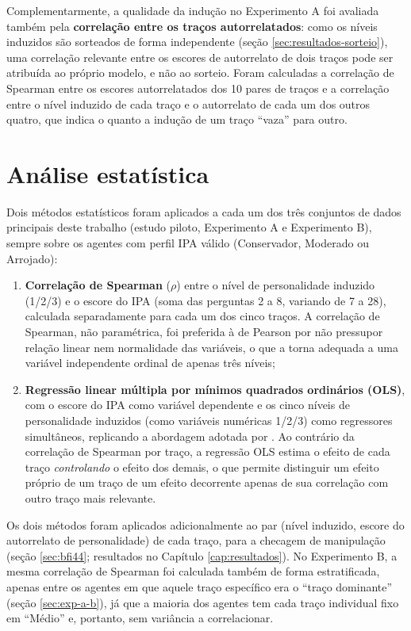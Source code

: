 Complementarmente, a qualidade da indução no Experimento A foi avaliada
também pela \textbf{correlação entre os traços autorrelatados}: como os
níveis induzidos são sorteados de forma independente (seção
\ref{sec:resultados-sorteio}), uma correlação relevante entre os escores
de autorrelato de dois traços pode ser atribuída ao próprio modelo, e não
ao sorteio. Foram
calculadas a correlação de Spearman entre os escores autorrelatados dos
10 pares de traços e a correlação entre o nível induzido de cada traço e
o autorrelato de cada um dos outros quatro, que indica o quanto a
indução de um traço ``vaza'' para outro.

\section{Análise estatística}
\label{sec:analise-estatistica}

Dois métodos estatísticos foram aplicados a cada um dos três conjuntos de
dados principais deste trabalho (estudo piloto, Experimento A e
Experimento B), sempre sobre os agentes com perfil IPA válido
(Conservador, Moderado ou Arrojado):

\begin{enumerate}
    \item \textbf{Correlação de Spearman} ($\rho$) entre o nível de
    personalidade induzido (1/2/3) e o escore do IPA (soma das perguntas
    2 a 8, variando de 7 a 28), calculada separadamente para cada um dos
    cinco traços. A correlação de Spearman, não paramétrica, foi preferida
    à de Pearson por não pressupor relação linear nem normalidade das
    variáveis, o que a torna adequada a uma variável independente ordinal
    de apenas três níveis;
    \item \textbf{Regressão linear múltipla por mínimos quadrados
    ordinários (OLS)}, com o escore do IPA como variável dependente e os
    cinco níveis de personalidade induzidos (como variáveis numéricas
    1/2/3) como regressores simultâneos, replicando a abordagem adotada
    por . Ao contrário da correlação de
    Spearman por traço, a regressão OLS estima o efeito de cada traço
    \textit{controlando} o efeito dos demais, o que permite distinguir um
    efeito próprio de um traço de um efeito decorrente apenas de sua
    correlação com outro traço mais relevante.
\end{enumerate}

Os dois métodos foram aplicados adicionalmente ao par (nível induzido,
escore do autorrelato de personalidade) de cada traço, para a checagem de
manipulação (seção \ref{sec:bfi44}; resultados no Capítulo
\ref{cap:resultados}). No Experimento B, a mesma correlação de Spearman
foi calculada também de forma estratificada, apenas entre os agentes em
que aquele traço específico era o ``traço dominante'' (seção
\ref{sec:exp-a-b}), já que a maioria dos agentes tem cada traço
individual fixo em ``Médio'' e, portanto, sem variância a correlacionar.

